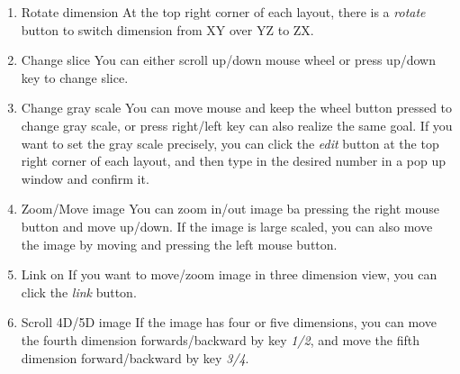 \documentclass[12pt]{article}
\begin{document}
\begin{enumerate}
	\item Rotate dimension
	\newline At the top right corner of each layout, there is a \textit{rotate} button to switch dimension from XY over YZ to ZX.
	\item Change slice
	\newline You can either scroll up/down mouse wheel or press up/down key to change slice.
	\item Change gray scale
	\newline You can move mouse and keep the wheel button pressed to change gray scale, or press right/left key can also realize the same goal. If you want to set the gray scale precisely, you can click the \textit{edit} button at the top right corner of each layout, and then type in the desired number in a pop up window and confirm it.
	\item Zoom/Move image
	\newline You can zoom in/out image ba pressing the right mouse button and move up/down. If the image is large scaled, you can also move the image by moving and pressing the left mouse button.
	\item Link on
	\newline If you want to move/zoom image in three dimension view, you can click the \textit{link} button. 
	\item Scroll 4D/5D image
	\newline If the image has four or five dimensions, you can move the fourth dimension forwards/backward by key \textit{1/2}, and move the fifth dimension forward/backward by key \textit{3/4}.
\end{enumerate}
\end{document}
